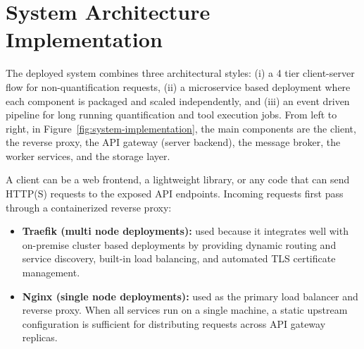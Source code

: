 \section{System Architecture Implementation}
\label{sec:sys-arch-implementation}
The deployed system combines three architectural styles: (i) a 4 tier client-server flow for non-quantification requests, (ii) a microservice based deployment where each component is packaged and scaled independently, and (iii) an event driven pipeline for long running quantification and tool execution jobs. From left to right, in Figure~\ref{fig:system-implementation}, the main components are the client, the reverse proxy, the API gateway (server backend), the message broker, the worker services, and the storage layer.

A client can be a web frontend, a lightweight library, or any code that can send HTTP(S) requests to the exposed API endpoints. Incoming requests first pass through a containerized reverse proxy:
\begin{itemize}
    \item \textbf{Traefik (multi node deployments):} used because it integrates well with on-premise cluster based deployments by providing dynamic routing and service discovery, built-in load balancing, and automated TLS certificate management.
    \item \textbf{Nginx (single node deployments):} used as the primary load balancer and reverse proxy. When all services run on a single machine, a static upstream configuration is sufficient for distributing requests across API gateway replicas.
\end{itemize}



